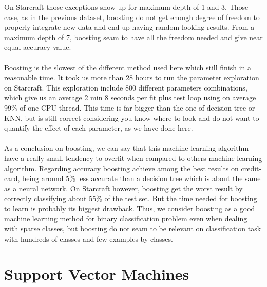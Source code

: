 \documentclass[twocolumn,a4paper,10pt]{article}
\begin{document}
On Starcraft those exceptions show up for maximum depth of 1 and 3.
Those case, as in the previous dataset, boosting do not get enough
degree of freedom to properly integrate new data and end up having
random looking results. From a maximum depth of 7, boosting seam to
have all the freedom needed and give near equal accuracy value.

\paragraph{}

Boosting is the slowest of the different method used here which still
finish in a reasonable time. It took us more than 28 hours to run
the parameter exploration on Starcraft. This exploration include 800
different parameters combinations, which give us an average 2 min
8 seconds per fit plus test loop using on average 99\% of one CPU
thread. This time is far bigger than the one of decision tree or KNN,
but is still correct considering you know where to look and do not
want to quantify the effect of each parameter, as we have done here.

\paragraph{}

As a conclusion on boosting, we can say that this machine learning
algorithm have a really small tendency to overfit when compared to
others machine learning algorithm. Regarding accuracy boosting achieve
among the best results on credit-card, being around 5\% less accurate
than a decision tree which is about the same as a neural network.
On Starcraft however, boosting get the worst result by correctly classifying
about 55\% of the test set. But the time needed for boosting to learn
is probably its biggest drawback. Thus, we consider boosting as a
good machine learning method for binary classification problem even
when dealing with sparse classes, but boosting do not seam to be relevant
on classification task with hundreds of classes and few examples by
classes.

\section{Support Vector Machines}

\paragraph{}
\end{document}
